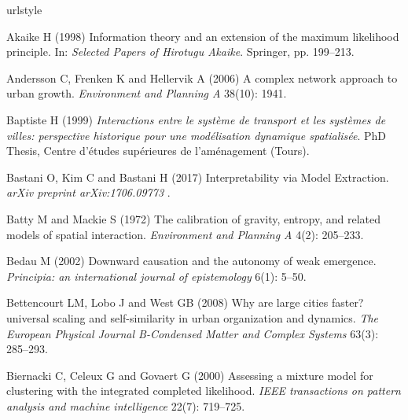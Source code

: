 \documentclass[Royal,sageh,times]{sagej}
\begin{document}
\begin{thebibliography}{51}
\providecommand{\natexlab}[1]{#1}
\providecommand{\url}[1]{\texttt{#1}}
\providecommand{\urlprefix}{URL }
\expandafter\ifx\csname urlstyle\endcsname\relax
  \providecommand{\doi}[1]{DOI:\discretionary{}{}{}#1}\else
  \providecommand{\doi}{DOI:\discretionary{}{}{}\begingroup
  \urlstyle{rm}\Url}\fi

Akaike H (1998) Information theory and an extension of the maximum likelihood
  principle.
\newblock In: \emph{Selected Papers of Hirotugu Akaike}. Springer, pp.
  199--213.

Andersson C, Frenken K and Hellervik A (2006) A complex network approach to
  urban growth.
\newblock \emph{Environment and Planning A} 38(10): 1941.

Baptiste H (1999) \emph{Interactions entre le syst{\`e}me de transport et les
  syst{\`e}mes de villes: perspective historique pour une mod{\'e}lisation
  dynamique spatialis{\'e}e}.
\newblock PhD Thesis, Centre d'{\'e}tudes sup{\'e}rieures de l'am{\'e}nagement
  (Tours).

{Bastani} O, {Kim} C and {Bastani} H (2017) {Interpretability via Model
  Extraction}.
\newblock \emph{arXiv preprint arXiv:1706.09773} .

Batty M and Mackie S (1972) The calibration of gravity, entropy, and related
  models of spatial interaction.
\newblock \emph{Environment and Planning A} 4(2): 205--233.

Bedau M (2002) Downward causation and the autonomy of weak emergence.
\newblock \emph{Principia: an international journal of epistemology} 6(1):
  5--50.

Bettencourt LM, Lobo J and West GB (2008) Why are large cities faster?
  universal scaling and self-similarity in urban organization and dynamics.
\newblock \emph{The European Physical Journal B-Condensed Matter and Complex
  Systems} 63(3): 285--293.

Biernacki C, Celeux G and Govaert G (2000) Assessing a mixture model for
  clustering with the integrated completed likelihood.
\newblock \emph{IEEE transactions on pattern analysis and machine intelligence}
  22(7): 719--725.


\end{thebibliography}
\end{document}
